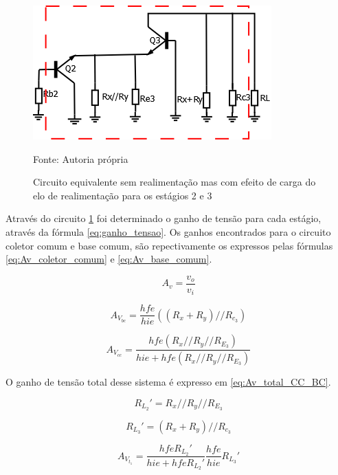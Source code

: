 \documentclass[openright]{normas-utf-tex} %
\begin{document}
\begin{figure}[H]
\centering
\includegraphics[width=0.75\linewidth]{img/AnaliseEstagio23.png}
\caption{Circuito equivalente sem realimentação mas com efeito de carga do elo de realimentação para os estágios 2 e 3}
Fonte: Autoria própria
\label{fig:AnaliseEstagio23}
\end{figure}

Através do circuito  \ref{fig:AnaliseEstagio23} foi determinado o ganho de tensão para cada estágio, através da fórmula \ref{eq:ganho_tensao}. Os ganhos encontrados para o circuito coletor comum e base comum, são repectivamente os expressos pelas fórmulas \ref{eq:Av_coletor_comum} e \ref{eq:Av_base_comum}.

\begin{equation}\label{eq:ganho_tensao}
A_{v} = \frac{v_o}{v_i}
\end{equation}


\begin{equation}\label{eq:Av_base_comum}
A_{V_{bc}}= \frac{hfe}{hie} \left(\left(R_{x}+R_{y}\right)//R_{c_3}\right)
\end{equation}

\begin{equation}\label{eq:Av_coletor_comum}
A_{V_{cc}}= \frac{hfe \left(R_x//R_y//R_{E_3}\right)}{hie+hfe\left(R_x//R_y//R_{E_3}\right)} 
\end{equation}


O ganho de tensão total desse sistema é expresso em \ref{eq:Av_total_CC_BC}.

\begin{equation}\label{eq:carga_est2}
R_{L_2}'=R_x//R_y//R_{E_3}
\end{equation}

\begin{equation}\label{eq:carga_est3}
R_{L_3}'=\left(R_{x}+R_{y}\right)//R_{c_3}
\end{equation}

\begin{equation}\label{eq:Av_total_CC_BC}
A_{V_{t_1}} = \frac{hfe R_{L_2}'}{hie+hfe R_{L_2}'}  \frac{hfe}{hie} R_{L_3}'
\end{equation}
\end{document}
